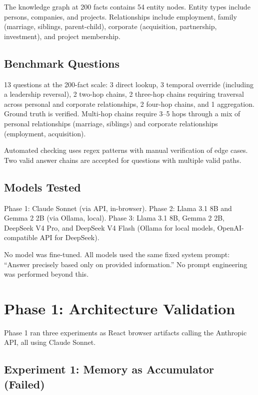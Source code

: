 \documentclass[11pt,a4paper]{article}
\begin{document}
The knowledge graph at 200 facts contains 54 entity nodes. Entity types include persons, companies, and projects. Relationships include employment, family (marriage, siblings, parent-child), corporate (acquisition, partnership, investment), and project membership.

\subsection{Benchmark Questions}

13 questions at the 200-fact scale: 3 direct lookup, 3 temporal override (including a leadership reversal), 2 two-hop chains, 2 three-hop chains requiring traversal across personal and corporate relationships, 2 four-hop chains, and 1 aggregation. Ground truth is verified. Multi-hop chains require 3--5 hops through a mix of personal relationships (marriage, siblings) and corporate relationships (employment, acquisition).

Automated checking uses regex patterns with manual verification of edge cases. Two valid answer chains are accepted for questions with multiple valid paths.

\subsection{Models Tested}

Phase 1: Claude Sonnet (via API, in-browser). Phase 2: Llama 3.1 8B and Gemma 2 2B (via Ollama, local). Phase 3: Llama 3.1 8B, Gemma 2 2B, DeepSeek V4 Pro, and DeepSeek V4 Flash (Ollama for local models, OpenAI-compatible API for DeepSeek).

No model was fine-tuned. All models used the same fixed system prompt: ``Answer precisely based only on provided information.'' No prompt engineering was performed beyond this.

\section{Phase 1: Architecture Validation}
\label{sec:phase1}

Phase 1 ran three experiments as React browser artifacts calling the Anthropic API, all using Claude Sonnet.

\subsection{Experiment 1: Memory as Accumulator (Failed)}
\end{document}
